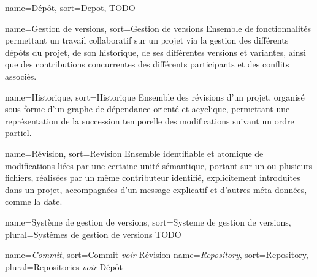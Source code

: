 
{
name=Dépôt,
sort=Depot,
}
{TODO}

{
name=Gestion de versions,
sort=Gestion de versions
}
{Ensemble de fonctionnalités permettant un travail collaboratif sur un projet via la gestion des différents dépôts du projet, de son historique, de ses différentes versions et variantes, ainsi que des contributions concurrentes des différents participants et des conflits associés.}

{
name=Historique,
sort=Historique
}
{Ensemble des révisions d'un projet, organisé sous forme d'un graphe de dépendance orienté et acyclique, permettant une représentation de la succession temporelle des modifications suivant un ordre partiel.}

{
name=Révision,
sort=Revision
}
{Ensemble identifiable et atomique de modifications liées par une certaine unité sémantique, portant sur un ou plusieurs fichiers, réalisées par un même contributeur identifié, explicitement introduites dans un projet, accompagnées d'un message explicatif et d'autres méta-données, comme la date.}

{
  name=Système de gestion de versions,
  sort=Systeme de gestion de versions,
  plural=Systèmes de gestion de versions
}
{TODO}

{
name={\it Commit\/},
sort=Commit
}
{{\it voir\/} Révision}
{
  name={\it Repository\/},
  sort=Repository,
  plural=Repositories
}
{{\it voir\/} Dépôt}